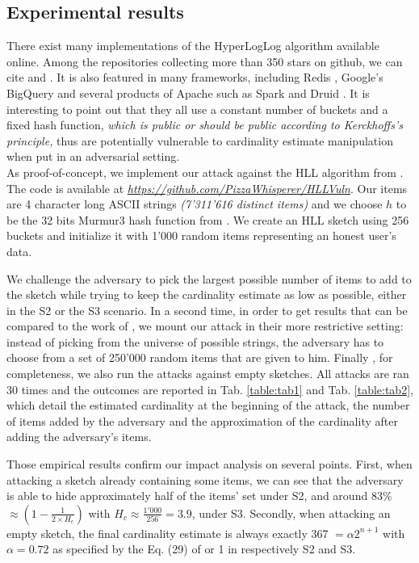 \documentclass{IEEEtran}
\begin{document}
\subsection{Experimental results}
There exist many implementations of the HyperLogLog algorithm available online. Among the repositories collecting more than 350 stars on github, we can cite \cite{clahll} and \cite{datasketch}. It is also featured in many frameworks, including Redis \cite{redis}, Google's BigQuery \cite{bigquery} and several products of Apache such as Spark \cite{spahll} \cite{spahll2} and Druid \cite{druhll}. It is interesting to point out that they all use a constant number of buckets and a fixed hash function, \textit{which is public or should be public according to Kerckhoffs's principle,} thus are potentially vulnerable to cardinality estimate manipulation when put in an adversarial setting.\\

As proof-of-concept, we implement our attack against the HLL algorithm from \cite{clahll}. The code is available at \href{https://github.com/PizzaWhisperer/HLLVuln}{\textit{\url{https://github.com/PizzaWhisperer/HLLVuln}}}. Our items are 4 character long ASCII strings \textit{(7'311'616 distinct items)} and we choose $h$ to be the 32 bits Murmur3 hash function from \cite{murmur3code}. We create an HLL sketch using 256 buckets and initialize it with 1'000 random items representing an honest user's data.

We challenge the adversary to pick the largest possible number of items to add to the sketch while trying to keep the cardinality estimate as low as possible, either in the S2 or the S3 scenario. In a second time, in order to get results that can be compared to the work of \cite{hllvuln}, we mount our attack in their more restrictive setting: instead of picking from the universe of possible strings, the adversary has to choose from a set of 250'000 random items that are given to him. Finally , for completeness, we also run the attacks against empty sketches. All attacks are ran 30 times and the outcomes are reported in Tab. \ref{table:tab1} and Tab. \ref{table:tab2}, which detail the estimated cardinality at the beginning of the attack, the number of items added by the adversary and the approximation of the cardinality after adding the adversary's items.

Those empirical results confirm our impact analysis on several points. First, when attacking a sketch already containing some items, we can see that the adversary is able to hide approximately half of the items' set under S2, and around 83\%%
$\approx (1-\frac{1}{2\times H_c})$ with $H_c\approx\frac{1'000}{256}=3.9$, under S3.
Secondly, when attacking an empty sketch, the final cardinality estimate is always exactly 367 $=\alpha2^{n+1}$ with $\alpha = 0.72$ as specified by the Eq. (29) of \cite{hll2} or 1 in respectively S2 and S3.
\end{document}
